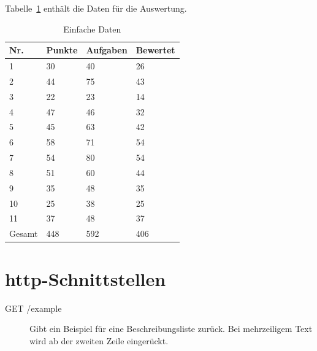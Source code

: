 Tabelle~\ref{tbl:evaluation-data} enthält die Daten für die Auswertung.

\begin{table}[htp]
    \centering
    \caption{Einfache Daten}
    \begin{tabular}{|l|l|l|l|}
    \hline
        Nr. & Punkte & Aufgaben & Bewertet \\
        \hline
        1  & 30 & 40 & 26 \\
        2  & 44 & 75 & 43 \\
        3  & 22 & 23 & 14 \\
        4  & 47 & 46 & 32 \\
        5  & 45 & 63 & 42 \\
        6  & 58 & 71 & 54 \\
        7  & 54 & 80 & 54 \\
        8  & 51 & 60 & 44 \\
        9  & 35 & 48 & 35 \\
        10 & 25 & 38 & 25 \\
        11 & 37 & 48 & 37 \\
        \hline
        Gesamt & 448 & 592 & 406 \\
        \hline
    \end{tabular}
    \label{tbl:evaluation-data}
\end{table}

\section{\acs{http}-Schnittstellen} %

\begin{description}
    \item[GET /example] Gibt ein Beispiel für eine Beschreibungsliste zurück.
    Bei mehrzeiligem Text wird ab der zweiten Zeile eingerückt.
\end{description}
